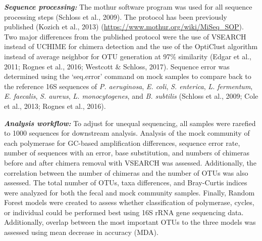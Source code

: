 \documentclass[11pt,]{article}
\begin{document}
\textbf{\emph{Sequence processing:}} The mothur software program was
used for all sequence processing steps (Schloss et al., 2009). The
protocol has been previously published (Kozich et al., 2013)
(\url{https://www.mothur.org/wiki/MiSeq_SOP}). Two major differences
from the published protocol were the use of VSEARCH instead of UCHIME
for chimera detection and the use of the OptiClust algorithm instead of
average neighbor for OTU generation at 97\% similarity (Edgar et al.,
2011; Rognes et al., 2016; Westcott \& Schloss, 2017). Sequence error
was determined using the `seq.error' command on mock samples to compare
back to the reference 16S sequences of \emph{P. aeruginosa}, \emph{E.
coli}, \emph{S. enterica}, \emph{L. fermentum}, \emph{E. faecalis},
\emph{S. aureus}, \emph{L. monocytogenes}, and \emph{B. subtilis}
(Schloss et al., 2009; Cole et al., 2013; Rognes et al., 2016).

\textbf{\emph{Analysis workflow:}} To adjust for unequal sequencing, all
samples were rarefied to 1000 sequences for downstream analysis.
Analysis of the mock community of each polymerase for GC-based
amplification differences, sequence error rate, number of sequences with
an error, base substitution, and numbers of chimeras before and after
chimera removal with VSEARCH was assessed. Additionally, the correlation
between the number of chimeras and the number of OTUs was also assessed.
The total number of OTUs, taxa differences, and Bray-Curtis indices were
analyzed for both the fecal and mock community samples. Finally, Random
Forest models were created to assess whether classification of
polymerase, cycles, or individual could be performed best using 16S rRNA
gene sequencing data. Additionally, overlap between the most important
OTUs to the three models was assessed using mean decrease in accuracy
(MDA).
\end{document}
